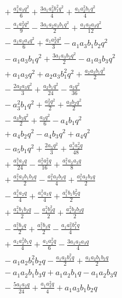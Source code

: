 \begin{align*}
&{}+ \frac{a_{1}^{2} a_{3} q^{2}}{6} + \frac{3 a_{1} a_{2}^{2} b_{1}^{2} q^{2}}{4} + \frac{a_{1} a_{2}^{2} b_{1} q^{2}}{4}\\
&{}- \frac{a_{1} a_{2}^{2} q^{2}}{9} - \frac{3 a_{1} a_{2} a_{3} b_{1} q^{2}}{2} + \frac{a_{1} a_{2} a_{3} q^{2}}{12}\\
&{}- \frac{a_{1} a_{2} a_{4} q^{2}}{6} + \frac{a_{1} a_{3}^{2} q^{2}}{3} - a_{1} a_{3} b_{1} b_{2} q^{2}\\
&{}- a_{1} a_{3} b_{1} q^{2} + \frac{3 a_{1} a_{3} b_{2} q^{2}}{2} - a_{1} a_{3} b_{3} q^{2}\\
&{}+ a_{1} a_{3} q^{2} + a_{2} a_{3} b_{1}^{2} q^{2} + \frac{a_{2} a_{3} b_{1} q^{2}}{2}\\
&{}- \frac{2 a_{2} a_{3} q^{2}}{3} + \frac{a_{2} b_{1} q^{2}}{24} - \frac{a_{2} q^{2}}{36}\\
&{}- a_{3}^{2} b_{1} q^{2} + \frac{a_{3}^{2} q^{2}}{2} + \frac{a_{3} b_{2} q^{2}}{2}\\
&{}- \frac{a_{3} b_{3} q^{2}}{2} + \frac{a_{3} q^{2}}{6} - a_{4} b_{1} q^{2}\\
&{}+ a_{4} b_{2} q^{2} - a_{4} b_{3} q^{2} + a_{4} q^{2}\\
&{}- a_{5} b_{1} q^{2} + \frac{2 a_{5} q^{2}}{3} + \frac{a_{1}^{3} a_{2}^{2} q}{48}\\
&{}+ \frac{a_{1}^{3} a_{2} q}{24} - \frac{a_{1}^{2} a_{2}^{2} q}{16} + \frac{a_{1}^{2} a_{2} a_{3} q}{8}\\
&{}+ \frac{a_{1}^{2} a_{2} b_{1} b_{2} q}{2} - \frac{a_{1}^{2} a_{2} b_{2} q}{4} + \frac{a_{1}^{2} a_{2} b_{3} q}{2}\\
&{}- \frac{a_{1}^{2} a_{2} q}{4} + \frac{a_{1}^{2} a_{3} q}{4} + \frac{a_{1}^{2} b_{1} b_{2}^{2} q}{2}\\
&{}+ \frac{a_{1}^{2} b_{1} b_{2} q}{2} - \frac{a_{1}^{2} b_{2}^{2} q}{2} + \frac{a_{1}^{2} b_{2} b_{3} q}{2}\\
&{}- \frac{a_{1}^{2} b_{2} q}{2} + \frac{a_{1}^{2} b_{3} q}{2} - \frac{a_{1} a_{2}^{2} b_{1}^{2} q}{4}\\
&{}+ \frac{a_{1} a_{2}^{2} b_{1} q}{4} + \frac{a_{1} a_{2}^{2} q}{6} - \frac{3 a_{1} a_{2} a_{3} q}{4}\\
&{}- a_{1} a_{2} b_{1}^{2} b_{2} q - \frac{a_{1} a_{2} b_{1}^{2} q}{2} + \frac{a_{1} a_{2} b_{1} b_{2} q}{2}\\
&{}- a_{1} a_{2} b_{1} b_{3} q + a_{1} a_{2} b_{1} q - a_{1} a_{2} b_{3} q\\
&{}- \frac{5 a_{1} a_{2} q}{24} + \frac{a_{1} a_{3}^{2} q}{4} + a_{1} a_{3} b_{1} b_{2} q\\

\end{align*}
